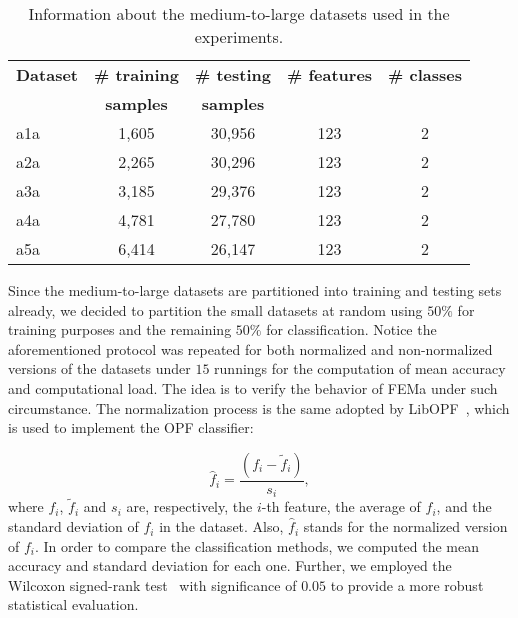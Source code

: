 \begin{table}[!htb]		    
\begin{center}
\caption{\label{tab.datasets2}Information about the medium-to-large datasets used in the experiments.}
\small
\begin{tabular}{  l | c | c | c | c }
    \textbf{Dataset}   & \textbf{\# training} & \textbf{\# testing} & \textbf{\# features}  & \textbf{\# classes}\\
    & \textbf{samples} & \textbf{samples} & &\\ \hline \hline
    a1a                &  1,605                     &     30,956                & 123                & 2               \\  
    a2a                &  2,265                     &     30,296                & 123                & 2               \\
    a3a                &  3,185                     &     29,376                & 123                & 2               \\
    a4a                &  4,781                     &     27,780                & 123                & 2               \\
    a5a                &  6,414                     &     26,147                & 123                & 2               \\ \hline		        
\end{tabular}		    	    
\end{center}		    
\end{table}

Since the medium-to-large datasets are partitioned into training and testing sets already, we decided to partition the small datasets at random using $50\%$ for training purposes and the remaining $50\%$ for classification. Notice the aforementioned protocol was repeated for both normalized and non-normalized versions of the datasets under $15$ runnings for the computation of mean accuracy and computational load. The idea is to verify the behavior of FEMa under such circumstance. The normalization process is the same adopted by LibOPF~\cite{LibOPF:14}, which is used to implement the OPF classifier:

\begin{equation}
\hat{f}_i = \frac{(f_i - \tilde{f}_i)}{s_i}, 
\end{equation}
where $f_i$, $\tilde{f}_i$ and $s_i$ are, respectively, the $i$-th feature, the average of $f_i$, and the standard deviation of $f_i$ in the dataset. Also, $\hat{f}_i$ stands for the normalized version of $f_i$. In order to compare the classification methods, we computed the mean accuracy and standard deviation for each one. Further, we employed the Wilcoxon signed-rank test~\cite{Wilcoxon:45} with significance of $0.05$ to provide a more robust statistical evaluation. 

